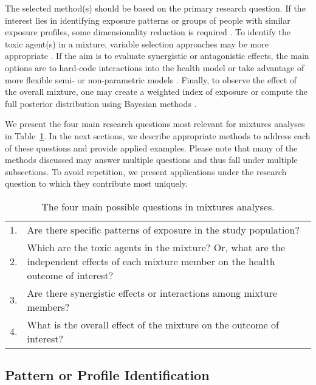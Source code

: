 The selected method(s) should be based on the primary research question. If the interest lies in identifying exposure patterns or groups of people with similar exposure profiles, some dimensionality reduction is required \citep{jolliffe02, jolliffe02b, thompson04, paatero94}. To identify the toxic agent(s) in a mixture, variable selection approaches may be more appropriate \citep{tibshirani96, zou05}. If the aim is to evaluate synergistic or antagonistic effects, the main options are to hard-code interactions into the health model or take advantage of more flexible semi- or non-parametric models \citep{bobb2014bayesian,coull2015,bobb2018statistical}. Finally, to observe the effect of the overall mixture, one may create a weighted index of exposure or compute the full posterior distribution using Bayesian methods \citep{carrico15,bobb2014bayesian,coull2015}.

We present the four main research questions most relevant for mixtures analyses in Table~\ref{tab:qx}. In the next sections, we describe appropriate methods to address each of these questions and provide applied examples. Please note that many of the methods discussed may answer multiple questions and thus fall under multiple subsections. To avoid repetition, we present applications under the research question to which they contribute most uniquely. \\

\begin{table}[ht]
\begin{center}
\caption{The four main possible questions in mixtures analyses.}
\label{tab:qx}
\begin{tabular}{|c p{15cm}|}
\hline
  1. & Are there specific patterns of exposure in the study population? \\
  2. & Which are the toxic agents in the mixture? Or, what are the independent effects of each mixture member on the health outcome of interest? \\
  3. & Are there synergistic effects or interactions among mixture members? \\
  4. & What is the overall effect of the mixture on the outcome of interest? \\
\hline
\end{tabular}
\end{center}
\end{table}
\subsection{Pattern or Profile Identification}\label{sec:Patterns}

